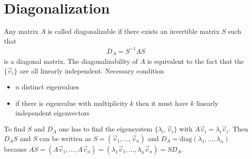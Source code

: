\documentclass[10pt,a4paper]{book}
\theoremstyle{definition}
\begin{document}
\section{Diagonalization}
Any  matrix $A$ is called diagonalizable if there exists an invertible matrix $S$ such that
\begin{align}
    D_A=S^{-1}AS
\end{align}
is a diagonal matrix. The diagonalizability of $A$ is equivalent to the fact that the $\{\vec{v}_i\}$ are all linearly independent. Necessary condition
\begin{itemize}
\item $n$ distinct eigenvalues
\item if there is eigenvalue with multiplicity $k$ then it must have $k$ linearly independent eigenvectors
\end{itemize}

To find $S$ and $D_A$ one has to find the eigensystem $\{\lambda_i,\vec{v}_i\}$ with $A\vec{v}_i=\lambda_i\vec{v}_i$. Then $D_AS$ and $S$ can be written as $S=(\vec{v}_1,...,\vec{v}_n)$ and $D_A=\text{diag}(\lambda_1,...,\lambda_n)$ because $AS=(A\vec{v}_1,...,A\vec{v}_n)=(\lambda_1\vec{v}_1,...,\lambda_n\vec{v}_n)=SD_A$.
\end{document}
